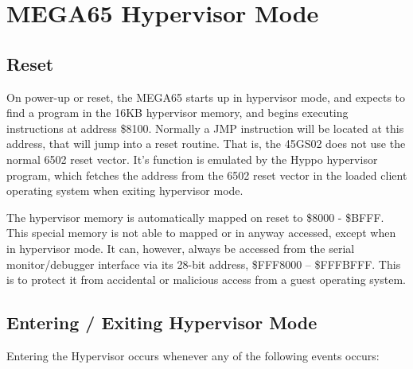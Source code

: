 

\section{MEGA65 Hypervisor Mode}
\label{sec:hypervisor-mode}

\subsection{Reset}

On power-up or reset, the MEGA65 starts up in hypervisor mode, and expects to find a program in the
16KB hypervisor memory, and begins executing instructions at address \$8100.  Normally a JMP instruction
will be located at this address, that will jump into a reset routine. That is, the 45GS02
does not use the normal 6502 reset vector. It's function is emulated by the Hyppo hypervisor program,
which fetches the address from the 6502 reset vector in the loaded client operating system when
exiting hypervisor mode.

The hypervisor memory is automatically mapped on reset to \$8000 - \$BFFF.  This special memory is not
able to mapped or in anyway accessed, except when in hypervisor mode. It can, however, always be accessed from the serial monitor/debugger
interface via its 28-bit address, \$FFF8000 -- \$FFFBFFF.  This is to protect it from accidental or malicious access from a guest operating system.

\subsection{Entering / Exiting Hypervisor Mode}

Entering the Hypervisor occurs whenever any of the following events occurs:

